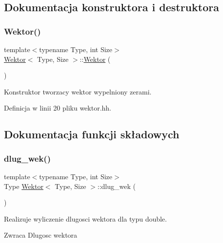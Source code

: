 \subsection{Dokumentacja konstruktora i destruktora}
\mbox{\label{class_wektor_a824a25627a2da1a8d1addc1f9ffd5688}} 
\subsubsection{\texorpdfstring{Wektor()}{Wektor()}}
{\footnotesize\ttfamily template$<$typename Type, int Size$>$ \\
\hyperlink{class_wektor}{Wektor}$<$ Type, Size $>$\+::\hyperlink{class_wektor}{Wektor} (\begin{DoxyParamCaption}{ }\end{DoxyParamCaption})\hspace{0.3cm}{\ttfamily [inline]}}



Konstruktor tworzacy wektor wypelniony zerami. 



Definicja w linii 20 pliku wektor.\+hh.



\subsection{Dokumentacja funkcji składowych}
\mbox{\label{class_wektor_a7a7ef7322f231052fc83b2b4b1954399}} 
\subsubsection{\texorpdfstring{dlug\+\_\+wek()}{dlug\_wek()}}
{\footnotesize\ttfamily template$<$typename Type, int Size$>$ \\
Type \hyperlink{class_wektor}{Wektor}$<$ Type, Size $>$\+::dlug\+\_\+wek (\begin{DoxyParamCaption}{ }\end{DoxyParamCaption})\hspace{0.3cm}{\ttfamily [inline]}}



Realizuje wyliczenie dlugosci wektora dla typu double. 

\begin{DoxyReturn}{Zwraca}
Dlugosc wektora 
\end{DoxyReturn}


